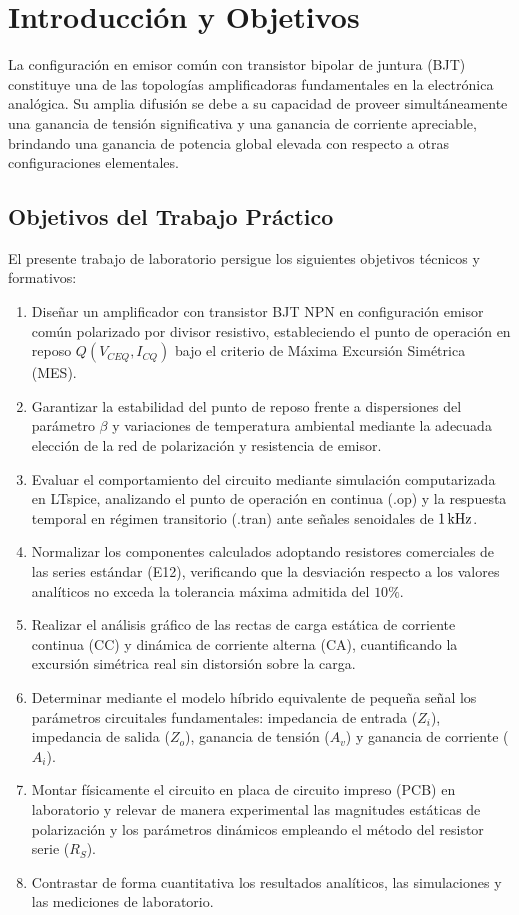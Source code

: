 \chapter{Introducción y Objetivos}
\label{chap:introduccion}

La configuración en emisor común con transistor bipolar de juntura (BJT) constituye una de las topologías
amplificadoras fundamentales en la electrónica analógica. Su amplia difusión se debe a su capacidad
de proveer simultáneamente una ganancia de tensión significativa y una ganancia de corriente apreciable,
brindando una ganancia de potencia global elevada con respecto a otras configuraciones elementales.

\section{Objetivos del Trabajo Práctico}

El presente trabajo de laboratorio persigue los siguientes objetivos técnicos y formativos:
\begin{enumerate}
  \item Diseñar un amplificador con transistor BJT NPN en configuración emisor común polarizado por divisor resistivo,
    estableciendo el punto de operación en reposo $Q(V_{CEQ}, I_{CQ})$ bajo el criterio de Máxima Excursión Simétrica (MES).
  \item Garantizar la estabilidad del punto de reposo frente a dispersiones del parámetro $\beta$ y variaciones
    de temperatura ambiental mediante la adecuada elección de la red de polarización y resistencia de emisor.
  \item Evaluar el comportamiento del circuito mediante simulación computarizada en LTspice, analizando el punto de
    operación en continua (.op) y la respuesta temporal en régimen transitorio (.tran) ante señales senoidales de $1\,\mathrm{kHz}$.
  \item Normalizar los componentes calculados adoptando resistores comerciales de las series estándar (E12),
    verificando que la desviación respecto a los valores analíticos no exceda la tolerancia máxima admitida del $10\%$.
  \item Realizar el análisis gráfico de las rectas de carga estática de corriente continua (CC) y dinámica de corriente
    alterna (CA), cuantificando la excursión simétrica real sin distorsión sobre la carga.
  \item Determinar mediante el modelo híbrido equivalente de pequeña señal los parámetros circuitales fundamentales:
    impedancia de entrada ($Z_i$), impedancia de salida ($Z_o$), ganancia de tensión ($A_v$) y ganancia de corriente ($A_i$).
  \item Montar físicamente el circuito en placa de circuito impreso (PCB) en laboratorio y relevar de manera experimental
    las magnitudes estáticas de polarización y los parámetros dinámicos empleando el método del resistor serie ($R_S$).
  \item Contrastar de forma cuantitativa los resultados analíticos, las simulaciones y las mediciones de laboratorio.
\end{enumerate}

